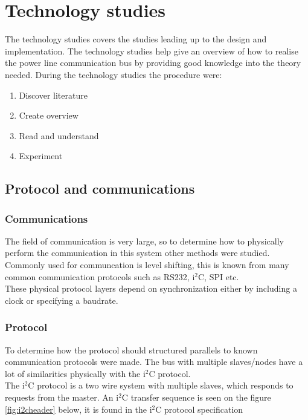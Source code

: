\chapter{Technology studies}

The technology studies covers the studies leading up to the design and implementation. The technology studies help give an overview of how to realise the power line communication bus by providing good knowledge into the theory needed. During the technology studies the procedure were:
\begin{enumerate}
\item Discover literature
\item Create overview
\item Read and understand
\item Experiment
\end{enumerate}


\section{Protocol and communications}

\subsection{Communications}
The field of communication is very large, so to determine how to physically perform the communication in this system other methods were studied.\\
Commonly used for communcation is level shifting, this is known from many common communication protocols such as RS232, i$^2$C, SPI etc.\\
These physical protocol layers depend on synchronization either by including a clock or specifying a baudrate.\\



\subsection{Protocol}
To determine how the protocol should structured parallels to known communication protocols were made. The bus with multiple slaves/nodes have a lot of similarities physically with the i$^2$C protocol.\\
The i$^2$C protocol is a two wire system with multiple slaves, which responds to requests from the master. An i$^2$C transfer sequence is seen on the figure \ref{fig:i2cheader} below, it is found in the i$^2$C protocol specification 

